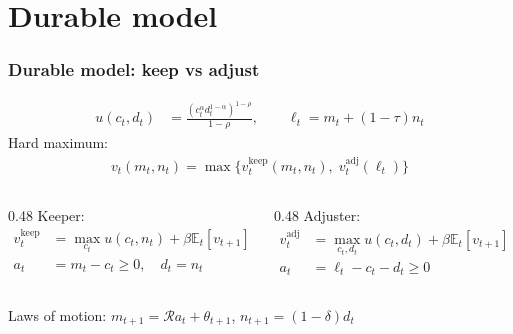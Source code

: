 \documentclass[aspectratio=169]{beamer}
\newcommand{\E}{\mathbb{E}}
\begin{document}
\section{Durable model}

\begin{frame}[label = DurBasic]
	\frametitle{Durable model: keep vs adjust}
	\begin{align*}
		u(c_t,d_t)&=\frac{(c_t^\alpha d_t^{1-\alpha})^{1-\rho}}{1-\rho},\qquad
		\ell_t=m_t+(1-\tau)n_t
	\end{align*}
	Hard maximum:
	\begin{align*}
		v_t(m_t,n_t)=\max\big\{v_t^{\mathrm{keep}}(m_t,n_t),\; v_t^{\mathrm{adj}}(\ell_t)\big\}
	\end{align*}
	\pause
	\begin{columns}[T]
		\begin{column}{0.48\textwidth}
			{\small Keeper:}
			\begin{align*}
				v_t^{\mathrm{keep}}&=\max_{c_t} u(c_t,n_t)+\beta\E_t[v_{t+1}]\\
				a_t&=m_t-c_t\ge 0,\quad d_t=n_t
			\end{align*}
		\end{column}
		\begin{column}{0.48\textwidth}
			{\small Adjuster:}
			\begin{align*}
				v_t^{\mathrm{adj}}&=\max_{c_t,d_t} u(c_t,d_t)+\beta\E_t[v_{t+1}]\\
				a_t&=\ell_t-c_t-d_t\ge 0
			\end{align*}
		\end{column}
	\end{columns}
	\vspace{0.25em}
	Laws of motion: $m_{t+1}=\mathcal{R}a_t+\theta_{t+1}$, $n_{t+1}=(1-\delta)d_t$
\end{frame}
\end{document}
